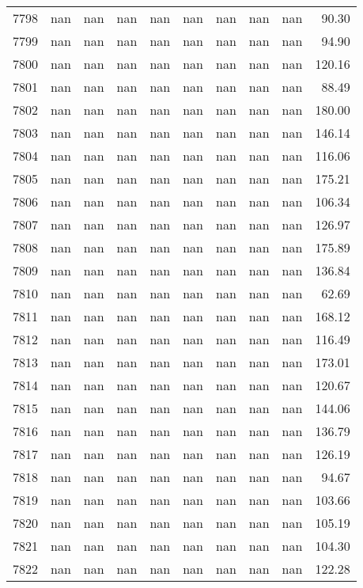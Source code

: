 \begin{tabular}{lrrrrrrrrr}
7798 & nan & nan & nan & nan & nan & nan & nan & nan & 90.30 \\
7799 & nan & nan & nan & nan & nan & nan & nan & nan & 94.90 \\
7800 & nan & nan & nan & nan & nan & nan & nan & nan & 120.16 \\
7801 & nan & nan & nan & nan & nan & nan & nan & nan & 88.49 \\
7802 & nan & nan & nan & nan & nan & nan & nan & nan & 180.00 \\
7803 & nan & nan & nan & nan & nan & nan & nan & nan & 146.14 \\
7804 & nan & nan & nan & nan & nan & nan & nan & nan & 116.06 \\
7805 & nan & nan & nan & nan & nan & nan & nan & nan & 175.21 \\
7806 & nan & nan & nan & nan & nan & nan & nan & nan & 106.34 \\
7807 & nan & nan & nan & nan & nan & nan & nan & nan & 126.97 \\
7808 & nan & nan & nan & nan & nan & nan & nan & nan & 175.89 \\
7809 & nan & nan & nan & nan & nan & nan & nan & nan & 136.84 \\
7810 & nan & nan & nan & nan & nan & nan & nan & nan & 62.69 \\
7811 & nan & nan & nan & nan & nan & nan & nan & nan & 168.12 \\
7812 & nan & nan & nan & nan & nan & nan & nan & nan & 116.49 \\
7813 & nan & nan & nan & nan & nan & nan & nan & nan & 173.01 \\
7814 & nan & nan & nan & nan & nan & nan & nan & nan & 120.67 \\
7815 & nan & nan & nan & nan & nan & nan & nan & nan & 144.06 \\
7816 & nan & nan & nan & nan & nan & nan & nan & nan & 136.79 \\
7817 & nan & nan & nan & nan & nan & nan & nan & nan & 126.19 \\
7818 & nan & nan & nan & nan & nan & nan & nan & nan & 94.67 \\
7819 & nan & nan & nan & nan & nan & nan & nan & nan & 103.66 \\
7820 & nan & nan & nan & nan & nan & nan & nan & nan & 105.19 \\
7821 & nan & nan & nan & nan & nan & nan & nan & nan & 104.30 \\
7822 & nan & nan & nan & nan & nan & nan & nan & nan & 122.28 \\

\end{tabular}
